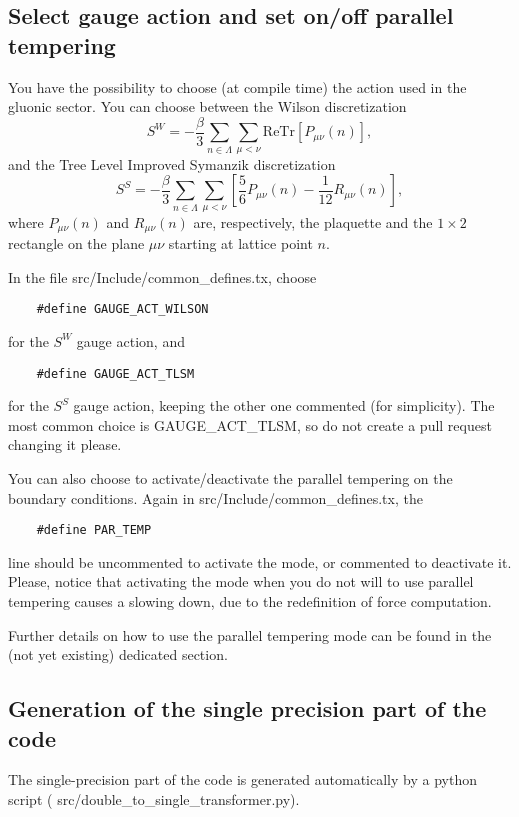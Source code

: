 \subsection{Select gauge action and set on/off parallel tempering}
You have the possibility to choose (at compile time) the action used in the gluonic sector. You can choose between the Wilson discretization
\begin{equation*}
	S^W = -\frac{\beta}{3}\sum_{n \in \Lambda}\sum_{\mu < \nu} \text{ReTr}\left[P_{\mu\nu}(n)\right],
\end{equation*}
and the Tree Level Improved Symanzik discretization
\begin{equation*}
	S^S = -\frac{\beta}{3}\sum_{n \in \Lambda}\sum_{\mu < \nu}\left[\frac{5}{6}P_{\mu\nu}(n)-\frac{1}{12}R_{\mu\nu}(n)\right],
\end{equation*}
where $P_{\mu\nu}(n)$ and $R_{\mu\nu}(n)$ are, respectively, the plaquette and the $1\times2$ rectangle on the plane $\mu\nu$ starting at lattice point $n$.

In the file \textsf{src/Include/common\_defines.tx}, choose
\begin{verbatim}
	#define GAUGE_ACT_WILSON
\end{verbatim}
for the $S^W$ gauge action, and
\begin{verbatim}
	#define GAUGE_ACT_TLSM
\end{verbatim}
for the $S^S$ gauge action, keeping the other one commented (for simplicity). The most common choice is \textsf{GAUGE\_ACT\_TLSM}, so do not create a pull request changing it please.

You can also choose to activate/deactivate the parallel tempering on the boundary conditions. Again in \textsf{src/Include/common\_defines.tx}, the
\begin{verbatim}
	#define PAR_TEMP
\end{verbatim}
line should be uncommented to activate the mode, or commented to deactivate it. Please, notice that activating the mode when you do not will to use parallel tempering causes a slowing down, due to the redefinition of force computation.

Further details on how to use the parallel tempering mode can be found in the (not yet existing) dedicated section.

\subsection{Generation of the single precision part of the code}
The single-precision part of the code is generated automatically 
by a python script (\textsf{ src/double\_to\_single\_transformer.py}).

